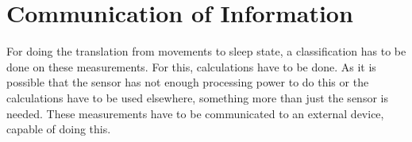 
\section{Communication of Information} %
\label{sec:communicating_relevant_information}
For doing the translation from movements to sleep state, a classification has to be done on these measurements. For this, calculations have to be done. As it is possible that the sensor has not enough processing power to do this or the calculations have to be used elsewhere, something more than just the sensor is needed. These measurements have to be communicated to an external device, capable of doing this.

